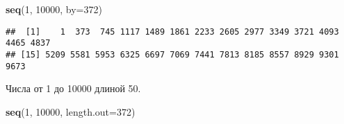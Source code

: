 \documentclass[]{article}
\newenvironment{Shaded}{\begin{snugshade}}{\end{snugshade}}
\newcommand{\KeywordTok}[1]{\textcolor[rgb]{0.13,0.29,0.53}{\textbf{#1}}}
\newcommand{\DataTypeTok}[1]{\textcolor[rgb]{0.13,0.29,0.53}{#1}}
\newcommand{\DecValTok}[1]{\textcolor[rgb]{0.00,0.00,0.81}{#1}}
\newcommand{\NormalTok}[1]{#1}
\begin{document}
\begin{Shaded}
\begin{Highlighting}[]
\KeywordTok{seq}\NormalTok{(}\DecValTok{1}\NormalTok{, }\DecValTok{10000}\NormalTok{, }\DataTypeTok{by=}\DecValTok{372}\NormalTok{)}
\end{Highlighting}
\end{Shaded}

\begin{verbatim}
##  [1]    1  373  745 1117 1489 1861 2233 2605 2977 3349 3721 4093 4465 4837
## [15] 5209 5581 5953 6325 6697 7069 7441 7813 8185 8557 8929 9301 9673
\end{verbatim}

Числа от 1 до 10000 длиной 50.

\begin{Shaded}
\begin{Highlighting}[]
\KeywordTok{seq}\NormalTok{(}\DecValTok{1}\NormalTok{, }\DecValTok{10000}\NormalTok{, }\DataTypeTok{length.out=}\DecValTok{372}\NormalTok{)}
\end{Highlighting}
\end{Shaded}
\end{document}
